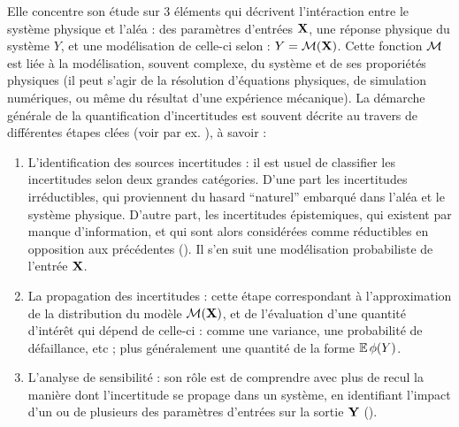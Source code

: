 Elle concentre son étude sur 3 éléments qui décrivent l'intéraction entre le système physique et l'aléa : des paramètres d'entrées $\mathbf{X}$, une réponse physique du système $ Y$, et une modélisation de celle-ci selon : $ Y=\mathcal{M}(\mathbf{X})$. %
Cette fonction $\mathcal{M}$ est liée à la modélisation, souvent complexe, du système et de ses proporiétés physiques (il peut s'agir de la résolution d'équations physiques, de simulation numériques, ou même du résultat d'une expérience mécanique).
%
La démarche générale de la quantification d'incertitudes est souvent décrite au travers de différentes étapes clées (voir par ex. \cite{sudret_uncertainty_2007, iooss_contributions_2009}), à savoir : %
%
\begin{enumerate}
    \item L'identification des sources incertitudes : 
        il est usuel de classifier les incertitudes selon deux grandes catégories. D'une part les incertitudes irréductibles, qui proviennent du hasard ``naturel'' embarqué dans l'aléa et le système physique. D'autre part, les incertitudes épistemiques, qui existent par manque d'information, et qui sont alors considérées comme réductibles en opposition aux précédentes (\cite{hullermeier_aleatoric_2019}). Il s'en suit une modélisation probabiliste de l'entrée $\mathbf{X}$. 
    \item La propagation des incertitudes : cette étape correspondant à l'approximation de la distribution du modèle $\mathcal{M}(\mathbf{X})$, et de l'évaluation d'une quantité d'intérêt qui dépend de celle-ci : comme une variance, une probabilité de défaillance, etc ; plus généralement une quantité de la forme $\mathbb{E}\,\phi( Y)$.
    \item L'analyse de sensibilité : son rôle est de comprendre avec plus de recul la manière dont l'incertitude se propage dans un système, en identifiant l'impact d'un ou de plusieurs des paramètres d'entrées sur la sortie $\mathbf{Y}$ (\cite{iooss_review_2015}).
\end{enumerate}


